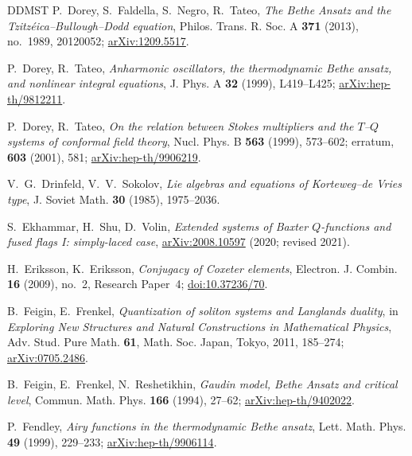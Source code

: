 \documentclass[11pt,leqno]{amsart}
\numberwithin{equation}{section}
\theoremstyle{plain}
\theoremstyle{definition}
\theoremstyle{plain}
\theoremstyle{definition}
\theoremstyle{remark}
\begin{document}
\begin{thebibliography}{DDMST}
P.~Dorey, S.~Faldella, S.~Negro, R.~Tateo,
\emph{The Bethe Ansatz and the Tzitz\'eica--Bullough--Dodd equation},
Philos. Trans. R. Soc. A \textbf{371} (2013), no.~1989, 20120052; \href{https://arxiv.org/abs/1209.5517}{arXiv:1209.5517}.

P.~Dorey, R.~Tateo,
\emph{Anharmonic oscillators, the thermodynamic Bethe ansatz, and nonlinear integral equations},
J. Phys. A \textbf{32} (1999), L419--L425; \href{https://arxiv.org/abs/hep-th/9812211}{arXiv:hep-th/9812211}.

P.~Dorey, R.~Tateo,
\emph{On the relation between Stokes multipliers and the $T$--$Q$ systems of conformal field theory},
Nucl. Phys. B \textbf{563} (1999), 573--602; erratum, \textbf{603} (2001), 581; \href{https://arxiv.org/abs/hep-th/9906219}{arXiv:hep-th/9906219}.

V.~G.~Drinfeld, V.~V.~Sokolov,
\emph{Lie algebras and equations of Korteweg--de Vries type},
J. Soviet Math. \textbf{30} (1985), 1975--2036.

S.~Ekhammar, H.~Shu, D.~Volin,
\emph{Extended systems of Baxter $Q$-functions and fused flags I: simply-laced case},
\href{https://arxiv.org/abs/2008.10597}{arXiv:2008.10597} (2020; revised 2021).

H.~Eriksson, K.~Eriksson,
\emph{Conjugacy of Coxeter elements},
Electron. J. Combin. \textbf{16} (2009), no.~2, Research Paper~4;
\href{https://doi.org/10.37236/70}{doi:10.37236/70}.

B.~Feigin, E.~Frenkel,
\emph{Quantization of soliton systems and Langlands duality},
in \emph{Exploring New Structures and Natural Constructions in Mathematical Physics}, Adv. Stud. Pure Math. \textbf{61}, Math. Soc. Japan, Tokyo, 2011, 185--274; \href{https://arxiv.org/abs/0705.2486}{arXiv:0705.2486}.

B.~Feigin, E.~Frenkel, N.~Reshetikhin,
\emph{Gaudin model, Bethe Ansatz and critical level},
Commun. Math. Phys. \textbf{166} (1994), 27--62; \href{https://arxiv.org/abs/hep-th/9402022}{arXiv:hep-th/9402022}.

P.~Fendley,
\emph{Airy functions in the thermodynamic Bethe ansatz},
Lett. Math. Phys. \textbf{49} (1999), 229--233; \href{https://arxiv.org/abs/hep-th/9906114}{arXiv:hep-th/9906114}.


\end{thebibliography}
\end{document}
